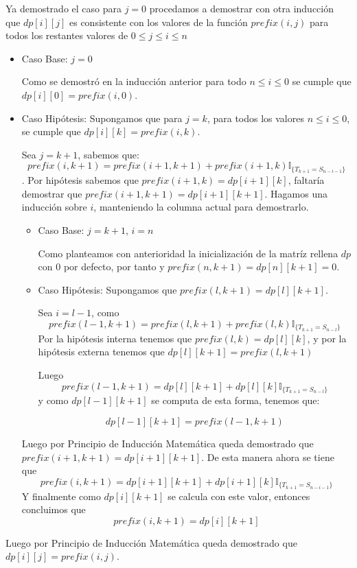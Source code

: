 \documentclass[a4paper]{article}
\begin{document}
Ya demostrado el caso para $j=0$ procedamos a demostrar con otra inducci\'on que $dp[i][j]$ es consistente con los valores de la funci\'on $prefix(i,j)$ para 
todos los restantes valores de $0 \leq j \leq i \leq n$

\begin{itemize}
    \item Caso Base: $j = 0$ 
    
    Como se demostr\'o en la inducción anterior para todo $n \leq i \leq 0$ se cumple que $dp[i][0] = prefix(i,0)$. 

    \item Caso Hip\'otesis: Supongamos que para $j = k$, para todos los valores $n \leq i \leq 0$, se cumple que $dp[i][k] = prefix(i,k)$.
    
    Sea $j = k+1$, sabemos que: $$prefix(i,k+1) = prefix(i+1,k+1) + prefix(i+1,k)\mathbb{I}_{\{ T_{k+1} = S_{n-i-1}\}}$$. Por hip\'otesis 
    sabemos que $prefix(i+1,k) = dp[i+1][k]$, faltar\'ia demostrar que $prefix(i+1,k+1) = dp[i+1][k+1]$. Hagamos una inducci\'on sobre $i$, manteniendo la columna actual 
    para demostrarlo. 

    \begin{itemize}
        \item Caso Base: $j = k+1$, $i = n$
        
        Como planteamos con anterioridad la inicializaci\'on de la matr\'iz rellena $dp$ con $0$ por defecto, por tanto  
        y  $prefix(n,k+1)=dp[n][k+1] = 0$. 

        \item Caso Hip\'otesis: Supongamos que $prefix(l,k+1) = dp[l][k+1]$. 
        
        Sea $i = l-1$, como $$prefix(l-1,k+1) = prefix(l,k+1) + prefix(l,k)\mathbb{I}_{\{ T_{k+1} = S_{n-l}\}}$$
        Por la hip\'otesis interna tenemos que $prefix(l,k) = dp[l][k]$,
        y por la hip\'otesis externa tenemos que $dp[l][k+1] = prefix(l,k+1)$

        Luego $$prefix(l-1,k+1) = dp[l][k+1] + dp[l][k]\mathbb{I}_{\{ T_{k+1} = S_{n-l}\}}$$
        y como $dp[l-1][k+1]$ se computa de esta forma, tenemos que:

        $$dp[l-1][k+1] = prefix(l-1,k+1)$$
    \end{itemize}

    Luego por Principio de Inducción Matemática queda demostrado que $prefix(i+1,k+1) = dp[i+1][k+1]$.
    De esta manera ahora se tiene que
    $$prefix(i,k+1) = dp[i+1][k+1] + dp[i+1][k]\mathbb{I}_{\{ T_{k+1} = S_{n-i-1}\}}$$
    Y finalmente como $dp[i][k+1]$ se calcula con este valor, entonces concluimos que
    $$prefix(i,k+1) = dp[i][k+1]$$
\end{itemize}
    Luego por Principio de Inducción Matem\'atica queda demostrado que $dp[i][j] = prefix(i,j)$.
    
\end{document}
